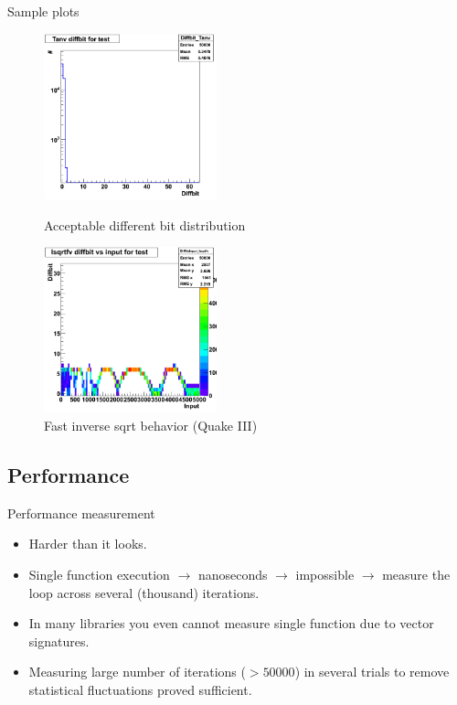 \documentclass[compress,mathserif]{beamer}
\theoremstyle{definition}
\theoremstyle{plain}
\newcommand{\beI}{\begin{itemize}}
\newcommand{\enI}{\end{itemize}}
\begin{document}
    \begin{frame}{Sample plots}
    \begin{figure}
        \begin{minipage}[l]{50mm}
           \center
           \includegraphics[width=50mm]{img/diffbit.png}
           \caption{Acceptable different bit distribution}
        \end{minipage}
        \begin{minipage}[r]{50mm}
            \center
            \includegraphics[width=50mm]{img/inputVSdiffbit.png}
            \caption{Fast inverse sqrt behavior (Quake III)}
        \end{minipage}
    \end{figure}
    \end{frame}
    
\subsection{Performance}
    \begin{frame}{Performance measurement}
        \beI
            \item Harder than it looks.
            \item Single function execution $\rightarrow$ nanoseconds $\rightarrow$
                impossible \newline $\rightarrow$ measure the loop across several (thousand) iterations.
            \item In many libraries you even cannot measure single function due to vector signatures.
            \item Measuring large number of iterations ($>50000$) in several trials to remove statistical fluctuations proved sufficient.
        \enI
    \end{frame}
    
\end{document}
